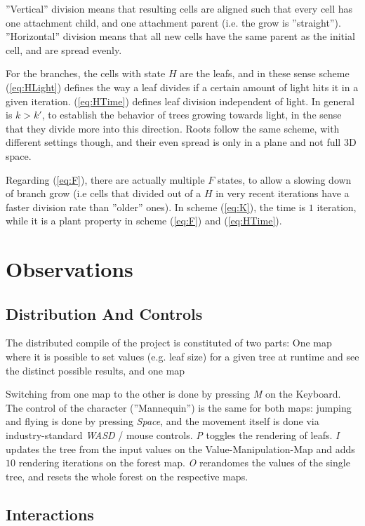 \documentclass[11pt]{scrartcl}
\begin{document}
''Vertical'' division means that resulting cells are aligned such that every cell has one attachment child, and one attachment parent (i.e. the grow is ''straight''). ''Horizontal'' division means that all new cells have the same parent as the initial cell, and are spread evenly.

For the branches, the cells with state $H$ are the leafs, and in these sense scheme (\ref{eq:HLight}) defines the way a leaf divides if a certain amount of light hits it in a given iteration. (\ref{eq:HTime}) defines leaf division independent of light. In general is $k > k'$, to establish the behavior of trees growing towards light, in the sense that they divide more into this direction. Roots follow the same scheme, with different settings though, and their even spread is only in a plane and not full 3D space.

Regarding (\ref{eq:F}), there are actually multiple $F$ states, to allow a slowing down of branch grow (i.e cells that divided out of a $H$ in very recent iterations have a faster division rate than ''older'' ones). In scheme (\ref{eq:K}), the time is $1$ iteration, while it is a plant property in scheme (\ref{eq:F}) and (\ref{eq:HTime}).

\section{Observations}
\subsection{Distribution And Controls}
The distributed compile of the project is constituted of two parts: One map where it is possible to set values (e.g. leaf size) for a given tree at runtime and see the distinct possible results, and one map 

Switching from one map to the other is done by pressing \textit{M} on the Keyboard. The control of the character (''Mannequin'') is the same for both maps: jumping and flying is done by pressing \textit{Space}, and the movement itself is done via industry-standard \textit{WASD} / mouse controls. \textit{P} toggles the rendering of leafs. \textit{I} updates the tree from the input values on the Value-Manipulation-Map and adds $10$ rendering iterations on the forest map. \textit{O} rerandomes the values of the single tree, and resets the whole forest on the respective maps.

\subsection{Interactions}
\end{document}
